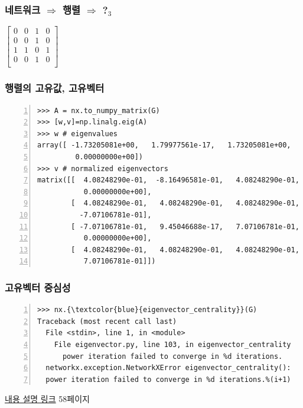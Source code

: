 \documentclass{beamer}
\begin{document}
\begin{frame}[fragile]
\frametitle{네트워크 $\Rightarrow$ 행렬 $\Rightarrow$ ?$_3$}
\begin{center}
\huge
\(
  \begin{bmatrix}
    0 & 0 & 1 & 0\\
    0 & 0 & 1 & 0\\
    1 & 1 & 0 & 1\\
    0 & 0 & 1 & 0\\
  \end{bmatrix}
\)
\end{center}
\end{frame}

\begin{frame}[fragile]
\frametitle{행렬의 고유값, 고유벡터}
\begin{block}{}
\small
	\begin{Verbatim}[numbers=left,commandchars=\\\{\}]
>>> A = nx.to_numpy_matrix(G)
>>> [w,v]=np.linalg.eig(A)
>>> w # eigenvalues
array([ -1.73205081e+00,   1.79977561e-17,   1.73205081e+00,
         0.00000000e+00])
>>> v # normalized eigenvectors
matrix([[  4.08248290e-01,  -8.16496581e-01,   4.08248290e-01,
           0.00000000e+00],
        [  4.08248290e-01,   4.08248290e-01,   4.08248290e-01,
          -7.07106781e-01],
        [ -7.07106781e-01,   9.45046688e-17,   7.07106781e-01,
           0.00000000e+00],
        [  4.08248290e-01,   4.08248290e-01,   4.08248290e-01,
           7.07106781e-01]])
	\end{Verbatim}
\end{block}
\end{frame}

\begin{frame}[fragile]
\frametitle{고유벡터 중심성}
\begin{block}{}
	\begin{Verbatim}[numbers=left,commandchars=\\\{\}]
>>> nx.{\textcolor{blue}{eigenvector_centrality}}(G)
Traceback (most recent call last)
  File <stdin>, line 1, in <module>
    File eigenvector.py, line 103, in eigenvector_centrality
      power iteration failed to converge in %d iterations.
  networkx.exception.NetworkXError eigenvector_centrality(): 
  power iteration failed to converge in %d iterations.%(i+1)
	\end{Verbatim}
\end{block}
\textcolor{red}{\href{http://www.slideshare.net/koorukuroo/network2-35160056}{내용 설명 링크}} {\tiny{58페이지}}
\end{frame}
\end{document}

